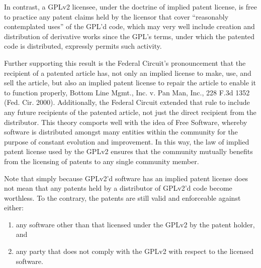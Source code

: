 In contrast, a GPLv2 licensee, under the doctrine of implied patent license, 
is free to practice any patent claims held by the licensor that cover 
``reasonably contemplated uses'' of the GPL'd code, which may very well 
include creation and distribution of derivative works since the GPL's terms, 
under which the patented code is distributed, expressly permits such activity.


Further supporting this result is the Federal Circuit's pronouncement that
the recipient of a patented article has, not only an implied license to
make, use, and sell the article, but also an implied patent license to
repair the article to enable it to function properly, Bottom Line Mgmt.,
Inc. v. Pan Man, Inc., 228 F.3d 1352 (Fed. Cir. 2000). Additionally, the
Federal Circuit extended that rule to include any future recipients of the
patented article, not just the direct recipient from the distributor.
This theory comports well with the idea of Free Software, whereby software
is distributed amongst many entities within the community for the purpose
of constant evolution and improvement. In this way, the law of implied
patent license used by the GPLv2 ensures that the community mutually
benefits from the licensing of patents to any single community member.



Note that simply because GPLv2'd software has an implied patent license does
not mean that any patents held by a distributor of GPLv2'd code become
worthless. To the contrary, the patents are still valid and enforceable
against either:

\begin{enumerate}
 \renewcommand{\theenumi}{\alph{enumi}}
 \renewcommand{\labelenumi}{\textup{(\theenumi)}}

\item any software other than that licensed under the GPLv2 by the patent
  holder, and

\item any party that does not comply with the GPLv2
with respect to the licensed software.
\end{enumerate}

\newcommand{\compB}{$\mathcal{B}$}
\newcommand{\compA}{$\mathcal{A}$}

